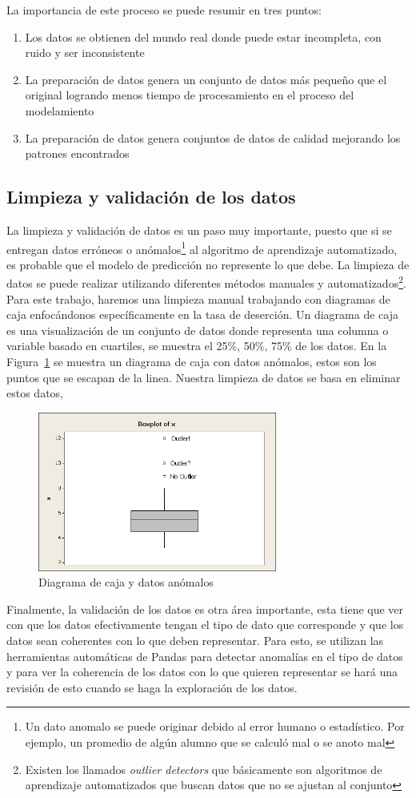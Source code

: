 La importancia de este proceso se puede resumir en tres puntos:
\begin{enumerate}
  \item Los datos se obtienen del mundo real donde puede estar incompleta, con ruido y ser inconsistente
  \item La preparación de datos genera un conjunto de datos más pequeño que el original logrando menos tiempo de procesamiento en el proceso del modelamiento
  \item La preparación de datos genera conjuntos de datos de calidad mejorando los patrones encontrados
\end{enumerate}
\subsection{Limpieza y validación de los datos}
La limpieza y validación de datos es un paso muy importante, puesto que si se entregan datos erróneos o anómalos\footnote{Un dato anomalo se puede originar debido al error humano o estadístico. Por ejemplo, un promedio de algún alumno que se calculó mal o se anoto mal } al algoritmo de aprendizaje automatizado, es probable que el modelo de predicción no represente lo que debe. La limpieza de datos se puede realizar utilizando diferentes métodos manuales y automatizados\footnote{Existen los llamados \textit{outlier detectors} que básicamente son algoritmos de aprendizaje automatizados que buscan datos que no se ajustan al conjunto}. Para este trabajo, haremos una limpieza manual trabajando con diagramas de caja enfocándonos específicamente en la tasa de deserción.
Un diagrama de caja es una visualización de un conjunto de datos donde representa una columna o variable basado en cuartiles, se muestra el 25\%, 50\%, 75\% de los datos.
En la Figura~\ref{fig:outlier} se muestra un diagrama de caja con datos anómalos, estos son los puntos que se escapan de la linea. Nuestra limpieza de datos se basa en eliminar estos datos,
\begin{figure}
  \centering
    \includegraphics[width=0.7\textwidth]{Figuras/outlier1}
      \caption{Diagrama de caja y datos anómalos}
    \label{fig:outlier}
\end{figure}
Finalmente, la validación de los datos es otra área importante, esta tiene que ver con que los datos efectivamente tengan el tipo de dato que corresponde y que los datos sean coherentes con lo que deben representar. Para esto, se utilizan las herramientas automáticas de Pandas para detectar anomalías en el tipo de datos y para ver la coherencia de los datos con lo que quieren representar se hará una revisión de esto cuando se haga la exploración de los datos.

